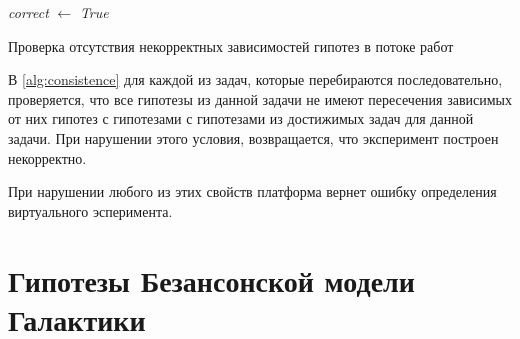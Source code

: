 \begin{algorithm}


    \textit{correct} $\gets$ \textit{True}

    \caption{Проверка отсутствия некорректных зависимостей гипотез в потоке работ}\label{alg:consistence}
\end{algorithm}


В \cref{alg:consistence} для каждой из задач, которые перебираются последовательно, проверяется, что все гипотезы из 
данной задачи не имеют пересечения зависимых от них гипотез с гипотезами с гипотезами из достижимых задач для данной 
задачи. При нарушении этого условия, возвращается, что эксперимент построен некорректно.

При нарушении любого из этих свойств платформа вернет ошибку определения виртуального эсперимента.

\section{Гипотезы Безансонской модели Галактики}
